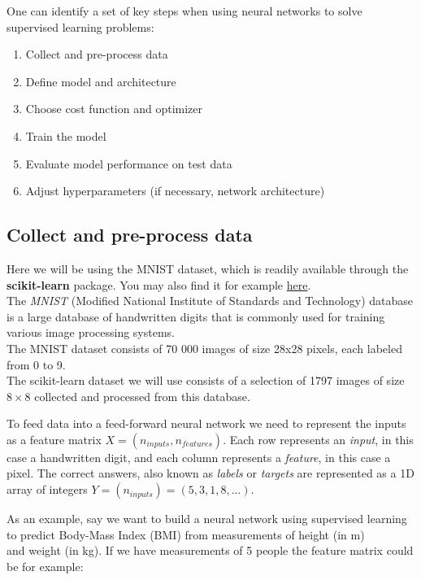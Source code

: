 \documentclass[11pt]{article}
\begin{document}
One can identify a set of key steps when using neural networks to solve
supervised learning problems:

\begin{enumerate}
\def\labelenumi{\arabic{enumi}.}
\item
  Collect and pre-process data
\item
  Define model and architecture
\item
  Choose cost function and optimizer
\item
  Train the model
\item
  Evaluate model performance on test data
\item
  Adjust hyperparameters (if necessary, network architecture)
\end{enumerate}

\hypertarget{collect-and-pre-process-data}{%
\subsection{Collect and pre-process
data}\label{collect-and-pre-process-data}}

Here we will be using the MNIST dataset, which is readily available
through the \textbf{scikit-learn} package. You may also find it for
example \href{http://yann.lecun.com/exdb/mnist/}{here}.\\
The \emph{MNIST} (Modified National Institute of Standards and
Technology) database is a large database of handwritten digits that is
commonly used for training various image processing systems.\\
The MNIST dataset consists of 70 000 images of size 28x28 pixels, each
labeled from 0 to 9.\\
The scikit-learn dataset we will use consists of a selection of 1797
images of size \(8\times 8\) collected and processed from this database.

To feed data into a feed-forward neural network we need to represent the
inputs as a feature matrix \(X = (n_{inputs}, n_{features})\). Each row
represents an \emph{input}, in this case a handwritten digit, and each
column represents a \emph{feature}, in this case a pixel. The correct
answers, also known as \emph{labels} or \emph{targets} are represented
as a 1D array of integers \(Y = (n_{inputs}) = (5, 3, 1, 8,...)\).

As an example, say we want to build a neural network using supervised
learning to predict Body-Mass Index (BMI) from measurements of height
(in m)\\
and weight (in kg). If we have measurements of 5 people the feature
matrix could be for example:
\end{document}
